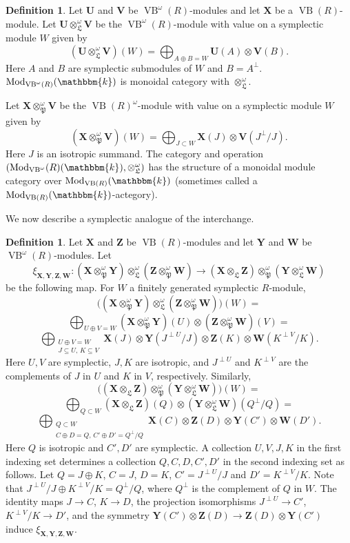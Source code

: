 \documentclass[11pt,letterpaper]{amsart}
\newcommand{\bk}{\mathbbm{k}}
\DeclareMathOperator{\Mod}{Mod}
\DeclareMathOperator{\VB}{VB}
\newcommand{\gU}{\mathbf{U}}
\newcommand{\gV}{\mathbf{V}}
\newcommand{\gW}{\mathbf{W}}
\newcommand{\gX}{\mathbf{X}}
\newcommand{\gY}{\mathbf{Y}}
\newcommand{\gZ}{\mathbf{Z}}
\newcommand{\C}{\mathbb{C}}
\newcommand{\PP}{\mathfrak{P}}
\newcommand{\LL}{\mathfrak{L}}
\numberwithin{theoremcounter}{section}
\theoremstyle{definition}
\newtheorem{definition}[Defauto]{Definition}
\theoremstyle{remark}
\begin{document}
\begin{definition}
    Let $\gU$ and $\gV$ be $\VB^\omega(R)$-modules and let $\gX$ be a $\VB(R)$-module. Let $\gU \otimes_\LL^\omega \gV$ be the $\VB^\omega(R)$-module with value on a symplectic module $W$ given by $$(\gU \otimes_\LL^\omega \gV)(W)=\bigoplus_{A \oplus B=W}\gU(A) \otimes \gV(B).$$ Here $A$ and $B$ are symplectic submodules of $W$ and $B=A^\perp$. $\Mod_{\VB^\omega(R)}(\bk)$ is monoidal category with $\otimes_\LL^\omega$.

    Let $\gX \otimes_\PP^\omega \gV$ be the $\VB(R)^\omega$-module with value on a symplectic module $W$ given by $$(\gX \otimes_\PP^\omega \gV)(W)=\bigoplus_{J \subset W}\gX(J) \otimes \gV(J^\perp/J).$$ Here $J$ is an isotropic summand. The category and operation $(\Mod_{\VB^\omega}(R)(\bk),\otimes_\LL^\omega)$ has the structure of a monoidal  module category over $\Mod_{\VB(R)}(\bk)$ (sometimes called a $\Mod_{\VB(R)}(\bk)$-actegory).
\end{definition}

We now describe a symplectic analogue of the interchange.

\begin{definition}
    Let $\gX$ and $\gZ$ be $\VB(R)$-modules and let $\gY$ and $\gW$ be $\VB^\omega(R)$-modules. Let 
    $$\xi_{\gX,\gY,\gZ,\gW} \colon (\gX \otimes_\PP^\omega \gY) \otimes_\LL^\omega (\gZ \otimes_\PP^\omega \gW) \to (\gX \otimes_\LL \gZ) \otimes_\PP^\omega (\gY \otimes_\LL^\omega \gW)$$ 
    be the following map. For $W$ a finitely generated symplectic $R$-module, 
    $$\Big((\gX \otimes^\omega_\PP \gY) \otimes_\LL^\omega (\gZ \otimes_\PP^\omega \gW)\Big)(W)=$$
    $$\bigoplus_{U \oplus V =W} (\gX \otimes^\omega_\PP \gY)(U) \otimes (\gZ \otimes_\PP^\omega \gW)(V) = $$
    $$\bigoplus_{\substack{U \oplus V =W\\  J \subseteq U,\, K \subseteq V}} \gX(J) \otimes \gY(J^{\perp U}/J) \otimes \gZ(K) \otimes \gW(K^{\perp V}/K).  $$
    Here $U,V$ are symplectic, $J,K$ are isotropic, and $J^{\perp U}$ and $K^{\perp V}$ are the complements of $J$ in $U$ and $K$ in $V$, respectively.  
    Similarly, 
    $$\big((\gX \otimes_\LL \gZ) \otimes_\PP^\omega (\gY \otimes_\LL^\omega \gW) \Big)(W)=$$ 
    $$\bigoplus_{Q \subset W} (\gX \otimes_\LL \gZ)(Q) \otimes (\gY \otimes_\LL^\omega \gW)(Q^\perp/Q)=$$ 
    $$\bigoplus_{\substack{ Q \subset  W\\C \oplus D=Q, \, C' \oplus D'=Q^\perp/Q} } \gX(C) \otimes \gZ(D) \otimes \gY(C') \otimes \gW(D').$$ 
    Here $Q$ is isotropic and $C',D'$ are symplectic.
A collection $U,V,J,K$ in the first indexing set determines a collection $Q,C,D,C',D'$ in the second indexing set as follows. Let $Q=J \oplus K$, $C=J$, $D=K$, $C'=J^{\perp U}/J$ and $D'=K^{\perp V}/K$. Note that $J^{\perp U}/J \oplus K^{\perp V}/K = Q^\perp/Q$, where $Q^\perp$ is the complement of $Q$ in $W$. The identity maps $J \to C$, $K \to D$, the projection isomorphisms $J^{\perp U} \to C'$, $K^{\perp V}/K \to D'$, and the symmetry  $\gY(C') \otimes \gZ(D) \to \gZ(D) \otimes \gY(C')$ induce $\xi_{\gX,\gY,\gZ,\gW}$. 
\end{definition}
\end{document}
